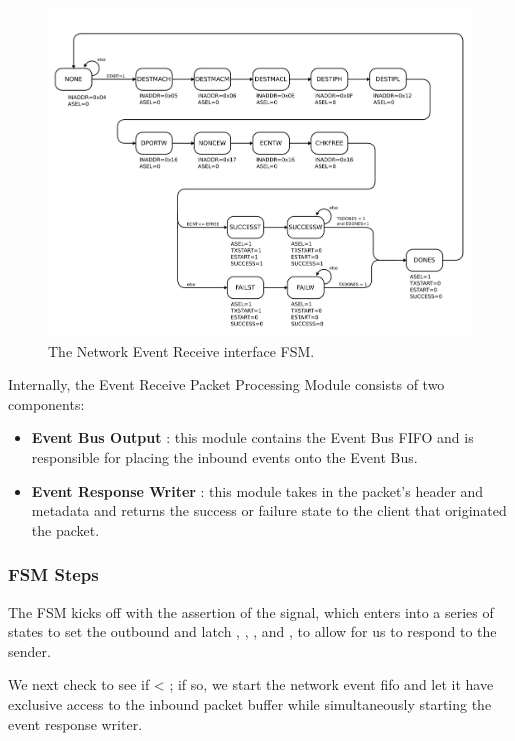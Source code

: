 \begin{figure}
\begin{centering}
\includegraphics[scale=0.8]{eventreceive.fsm.svg}
\end{centering}
\caption{The Network Event Receive interface FSM.}
\label{eventreceive.fsm}
\end{figure}

Internally, the Event Receive Packet Processing Module consists of two components:
\begin{itemize}
\item \textbf{Event Bus Output} : this module contains the Event Bus FIFO and is responsible for placing the inbound events onto the Event Bus. 
\item \textbf{Event Response Writer} : this module takes in the packet's header and metadata and returns the success or failure state to the client that originated the packet. 
\end{itemize}

\subsubsection{FSM Steps}

The FSM kicks off with the assertion of the  signal,
which enters into a series of states to set the outbound
 and latch , ,
, and , to allow for us to respond to
the sender.

We next check to see if  < ; if so, we
start the network event fifo and let it have exclusive access to the
inbound packet buffer while simultaneously starting the event response
writer.

